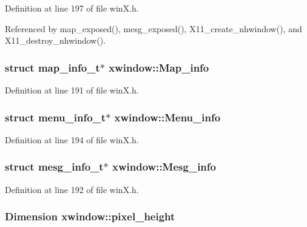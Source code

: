 Definition at line 197 of file win\+X.\+h.



Referenced by map\+\_\+exposed(), mesg\+\_\+exposed(), X11\+\_\+create\+\_\+nhwindow(), and X11\+\_\+destroy\+\_\+nhwindow().

\hypertarget{structxwindow_a5ad3075ccdab48dd66499a4feee475b7}{
\subsubsection[{Map\+\_\+info}]{\setlength{\rightskip}{0pt plus 5cm}struct {\bf map\+\_\+info\+\_\+t}$\ast$ xwindow\+::\+Map\+\_\+info}}\label{structxwindow_a5ad3075ccdab48dd66499a4feee475b7}


Definition at line 191 of file win\+X.\+h.

\hypertarget{structxwindow_a60b1f8239efbe6ed2ef51f61ddfae6e1}{
\subsubsection[{Menu\+\_\+info}]{\setlength{\rightskip}{0pt plus 5cm}struct {\bf menu\+\_\+info\+\_\+t}$\ast$ xwindow\+::\+Menu\+\_\+info}}\label{structxwindow_a60b1f8239efbe6ed2ef51f61ddfae6e1}


Definition at line 194 of file win\+X.\+h.

\hypertarget{structxwindow_a862769ba57e4c91fb372be9748bc406b}{
\subsubsection[{Mesg\+\_\+info}]{\setlength{\rightskip}{0pt plus 5cm}struct {\bf mesg\+\_\+info\+\_\+t}$\ast$ xwindow\+::\+Mesg\+\_\+info}}\label{structxwindow_a862769ba57e4c91fb372be9748bc406b}


Definition at line 192 of file win\+X.\+h.

\hypertarget{structxwindow_aab5493256f7f6baa33fe878ab6c403f5}{
\subsubsection[{pixel\+\_\+height}]{\setlength{\rightskip}{0pt plus 5cm}Dimension xwindow\+::pixel\+\_\+height}}\label{structxwindow_aab5493256f7f6baa33fe878ab6c403f5}


